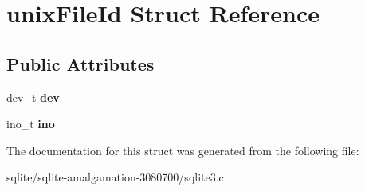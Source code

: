 \hypertarget{structunix_file_id}{\section{unix\+File\+Id Struct Reference}
\label{structunix_file_id}
}
\subsection*{Public Attributes}
\begin{DoxyCompactItemize}
\item 
\hypertarget{structunix_file_id_acf703d95b9a1ae2f34affb7e9ae45e1b}{dev\+\_\+t {\bfseries dev}}\label{structunix_file_id_acf703d95b9a1ae2f34affb7e9ae45e1b}

\item 
\hypertarget{structunix_file_id_a2cc2d43e9d3f0a60810daa8fc353e692}{ino\+\_\+t {\bfseries ino}}\label{structunix_file_id_a2cc2d43e9d3f0a60810daa8fc353e692}

\end{DoxyCompactItemize}


The documentation for this struct was generated from the following file\+:\begin{DoxyCompactItemize}
\item 
sqlite/sqlite-\/amalgamation-\/3080700/sqlite3.\+c\end{DoxyCompactItemize}
